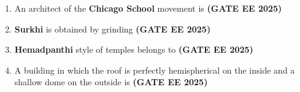 \documentclass[journal,12pt,onecolumn]{IEEEtran}
\theoremstyle{remark}
\begin{document}
\begin{enumerate}
\begin{enumerate}
\end{enumerate}
\item An architect of the \textbf{Chicago School} movement is \hfill \textbf{(GATE EE 2025)}
\begin{enumerate}
\end{enumerate}
\item \textbf{Surkhi} is obtained by grinding \hfill \textbf{(GATE EE 2025)}
\begin{enumerate}
\end{enumerate}
\item \textbf{Hemadpanthi} style of temples belongs to \hfill \textbf{(GATE EE 2025)}
\begin{enumerate}
\end{enumerate}
\item  A building in which the roof is perfectly hemispherical on the inside and a shallow dome on the outside is \hfill \textbf{(GATE EE 2025)}
\begin{enumerate}
\end{enumerate}

\end{enumerate}
\end{document}
